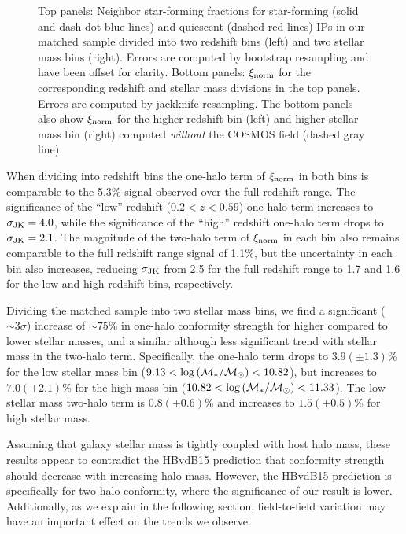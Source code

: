 \begin{figure*}
  \epstrim{0.2in 0.3in 0.4in 0.8in}
  \caption{
Top panels: Neighbor star-forming fractions for star-forming (solid and dash-dot blue lines) and quiescent (dashed red lines) IPs in our matched sample divided into two redshift bins (left) and two stellar mass bins (right).  Errors are computed by bootstrap resampling and have been offset for clarity.
Bottom panels: $\signorm$ for the corresponding redshift and stellar mass divisions in the top panels.  Errors are computed by jackknife resampling.
The bottom panels also show $\signorm$ for the higher redshift bin (left) and higher stellar mass bin (right) computed \emph{without} the COSMOS field (dashed gray line).
}
  \label{fig:latefrac_normsig_compare}
\end{figure*}

When dividing into redshift bins the one-halo term of $\signorm$ in both bins is comparable to the 5.3\% signal observed over the full redshift range.
The significance of the ``low'' redshift (${0.2<z<0.59}$) one-halo term increases to 
${\sigmaJK=4.0}$, while the significance of the ``high'' redshift one-halo term drops to ${\sigmaJK=2.1}$.
The magnitude of the two-halo term of $\signorm$ in each bin also remains comparable to the full redshift range signal of 1.1\%, but the uncertainty in each bin also increases,
reducing $\sigmaJK$ from 2.5 for the full redshift range to 1.7 and 1.6 for the low and high redshift bins, respectively.

Dividing the matched sample into two stellar mass bins, we find a significant ($\sim3\sigma$) increase of $\sim75\%$ in one-halo conformity strength for higher compared to lower stellar masses, and a similar although less significant trend with stellar mass in the two-halo term.
Specifically, the one-halo term drops to ${3.9(\pm1.3)}$\% for the low stellar mass bin (${9.13<\logM<10.82}$), but
increases to ${7.0(\pm2.1)}$\% for the high-mass bin (${10.82<\logM<11.33}$).
The low stellar mass two-halo term is ${0.8(\pm0.6)}$\% and increases to ${1.5(\pm0.5)}$\% for high stellar mass.

Assuming that galaxy stellar mass is tightly coupled with host halo mass, these results appear to contradict the HBvdB15 prediction that conformity strength should decrease with increasing halo mass.
However, the HBvdB15 prediction is specifically for two-halo conformity, where the significance of our result is lower.
Additionally, as we explain in the following section, field-to-field variation may have an important effect on the trends we observe.

